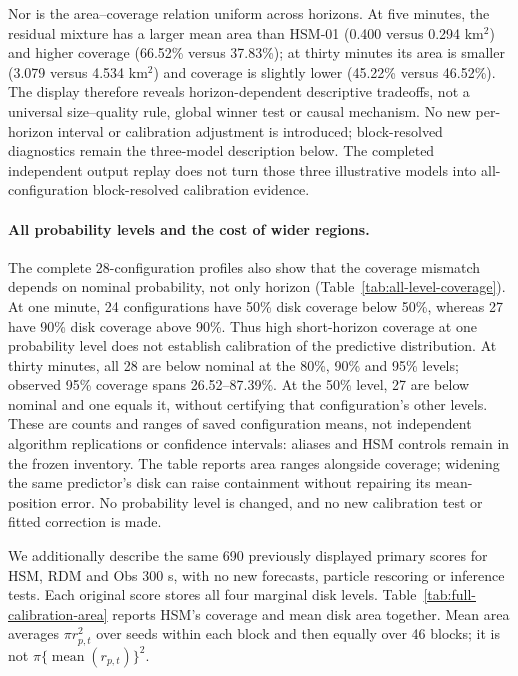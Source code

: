 Nor is the area--coverage relation uniform across horizons. At five minutes,
the residual mixture has a larger mean area than HSM-01 (0.400 versus
0.294 km\(^{2}\)) and higher coverage (66.52\% versus 37.83\%); at thirty
minutes its area is smaller (3.079 versus 4.534 km\(^{2}\)) and coverage
is slightly lower (45.22\% versus 46.52\%). The display therefore reveals
horizon-dependent descriptive tradeoffs, not a universal size--quality rule,
global winner test or causal mechanism. No new per-horizon interval or
calibration adjustment is introduced; block-resolved diagnostics remain
the three-model description below. The completed independent output replay
does not turn those three illustrative models into all-configuration
block-resolved calibration evidence.

\FloatBarrier

\paragraph{All probability levels and the cost of wider regions.}
The complete 28-configuration profiles also show that the coverage mismatch
depends on nominal probability, not only horizon
(Table~\ref{tab:all-level-coverage}). At one minute, 24 configurations have
50\% disk coverage below 50\%, whereas 27 have 90\% disk coverage above
90\%. Thus high short-horizon coverage at one probability level does not
establish calibration of the predictive distribution. At thirty minutes,
all 28 are below nominal at the 80\%, 90\% and 95\% levels; observed
95\% coverage spans 26.52--87.39\%. At the 50\% level, 27 are below
nominal and one equals it, without certifying that configuration's other
levels. These are counts and ranges of saved configuration means, not
independent algorithm replications or confidence intervals: aliases and
HSM controls remain in the frozen inventory. The table reports area
ranges alongside coverage; widening the same predictor's disk can raise
containment without repairing its mean-position error. No probability
level is changed, and no new calibration test or fitted correction is made.

We additionally describe the same 690 previously displayed primary scores
for HSM, RDM and Obs 300 s, with no new forecasts, particle rescoring or
inference tests. Each original score stores all four marginal disk levels.
Table~\ref{tab:full-calibration-area} reports HSM's coverage and mean disk
area together. Mean area averages \(\pi r_{p,t}^2\) over seeds within each
block and then equally over 46 blocks; it is not
\(\pi\{\operatorname{mean}(r_{p,t})\}^2\).

